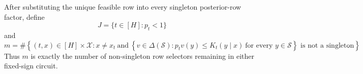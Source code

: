 After substituting the unique feasible row into every singleton posterior-row factor, define
\[
 J=\{t\in[H]:p_t<1\}
\]
and
\[
 m=\#\left\{(t,x)\in[H]\times\mathcal X:
 x\ne x_t\ \text{and}\ 
 \left\{v\in\Delta(\mathcal S):p_tv(y)\le K_t(y\mid x)
 \ \text{for every }y\in\mathcal S\right\}
 \text{ is not a singleton}\right\}.
\]
Thus \(m\) is exactly the number of non-singleton row selectors remaining in either fixed-sign circuit.